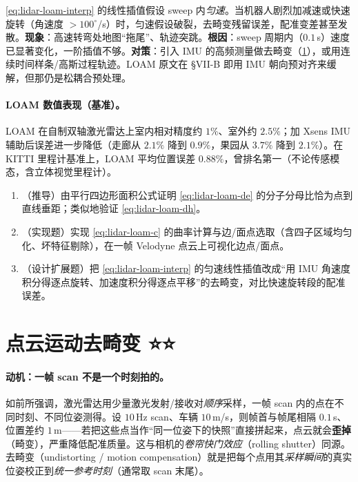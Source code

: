 \begin{pitfall}
\cref{eq:lidar-loam-interp} 的线性插值假设 sweep 内\emph{匀速}。当机器人剧烈加减速或快速旋转（角速度 $>100^\circ$/s）时，匀速假设破裂，去畸变残留误差，配准变差甚至发散。\textbf{现象}：高速转弯处地图“拖尾”、轨迹突跳。\textbf{根因}：sweep 周期内（$0.1$\,s）速度已显著变化，一阶插值不够。\textbf{对策}：引入 IMU 的高频测量做去畸变（\cref{sec:lidar-deskew}），或用连续时间样条/高斯过程轨迹。LOAM 原文在 §VII-B 即用 IMU 朝向预对齐来缓解，但那仍是松耦合预处理。
\end{pitfall}

\paragraph{LOAM 数值表现（基准）。}
LOAM 在自制双轴激光雷达上室内相对精度约 $1\%$、室外约 $2.5\%$\cite{zhang2014loam}；加 Xsens IMU 辅助后误差进一步降低（走廊从 $2.1\%$ 降到 $0.9\%$，果园从 $3.7\%$ 降到 $2.1\%$）。在 KITTI 里程计基准上，LOAM 平均位置误差 $0.88\%$，曾排名第一（不论传感模态，含立体视觉里程计）。

\begin{practice}
\begin{enumerate}
  \item （推导）由平行四边形面积公式证明 \cref{eq:lidar-loam-de} 的分子分母比恰为点到直线垂距；类似地验证 \cref{eq:lidar-loam-dh}。
  \item （实现题）实现 \cref{eq:lidar-loam-c} 的曲率计算与边/面点选取（含四子区域均匀化、坏特征剔除），在一帧 Velodyne 点云上可视化边点/面点。
  \item （设计扩展题）把 \cref{eq:lidar-loam-interp} 的匀速线性插值改成“用 IMU 角速度积分得逐点旋转、加速度积分得逐点平移”的去畸变，对比快速旋转段的配准误差。
\end{enumerate}
\end{practice}

\section{点云运动去畸变 ⭐⭐}
\label{sec:lidar-deskew}

\paragraph{动机：一帧 scan 不是一个时刻拍的。}
如前所强调，激光雷达用少量激光发射/接收对\emph{顺序}采样，一帧 scan 内的点在不同时刻、不同位姿测得。设 $10$\,Hz scan、车辆 $10$\,m/s，则帧首与帧尾相隔 $0.1$\,s、位置差约 $1$\,m——若把这些点当作“同一位姿下的快照”直接拼起来，点云就会\textbf{歪掉}（畸变），严重降低配准质量\cite{carlone2026handbook}。这与相机的\emph{卷帘快门效应}（rolling shutter）同源。去畸变（undistorting / motion compensation）就是把每个点用其\emph{采样瞬间}的真实位姿校正到\emph{统一参考时刻}（通常取 scan 末尾）。

